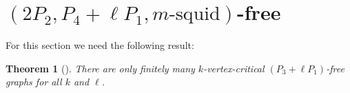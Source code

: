 \documentclass[11pt]{article}
\newtheorem{theorem}{Theorem}[section]
\newtheorem{lemma}[theorem]{Lemma}
\theoremstyle{definition}
\begin{document}
\section{$(2P_2,P_4+\ell P_1,m\text{-squid})$-free}

For this section we need the following result:

\begin{theorem}[\cite{AbuadasCameronHoangSawada2022}]\label{thm:P3ellP1free}
There are only finitely many $k$-vertex-critical $(P_3+\ell P_1)$-free graphs for all $k$ and $\ell$.
\end{theorem}
\end{document}
